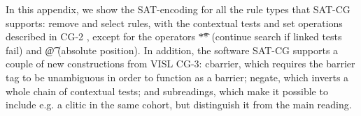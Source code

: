 \def\sobre{\text{\em sobre}}
\def\una{\text{\em una}}
\def\aproximacion{\text{ \em aproximaci\'{o}n}}
\def\mas{\text{\em m\'{a}s}}
\def\cientifica{\text{\em cient\'{\i}fica}}


\def\vPrsPThree{\text{\sc PrsP3}}
\def\vPrsPOne{\text{\sc PrsP1}}
\def\vImpPThree{\text{\sc ImpP3}}
\def\adj{{\text{\sc Adj}}}
\def\adv{{\text{\sc Adv}}}
\def\n{\text{\sc N}}
\def\pr{{\text{\sc Pr}}}
\def\prn{{\text{\sc Prn}}}
\def\det{{\text{\sc Det}}}
\def\notDet{{\neg \text{\sc Det}}}
\def\any{{\text{Any}}}


\def\sobrePr{\sobre_\pr}
\def\sobreN{\sobre_\n}

\def\unaNotDet{\una_\notDet}
\def\unaAny{\una_\any}
\def\unaPrn{\una_\prn}
\def\unaDet{\una_\det}
\def\unaPrsPThree{\una_\vPrsPThree}
\def\unaPrsPOne{\una_\vPrsPOne}
\def\unaImp{\una_\vImpPThree}
\def\aproximacionN{\aproximacion_\n}
\def\masAdv{\mas_\adv}
\def\masAdj{\mas_\adj}
\def\cientificaAdj{\cientifica_\adj}
\def\cientificaN{\cientifica_\n}


\def\newVar{\text{}} %

\def\cgrule#1{\noindent {\bf  #1 }}
\def\eqdef{\Coloneqq}
\def\impl{\quad\Longrightarrow\quad}

\def\ob#1{\overbrace{ #1 \rule{0pt}{2ex}}}






\label{appendix1}

\noindent In this appendix, we show the SAT-encoding for all the rule types that 
SAT-CG supports: 
{\sc remove} and {\sc select} rules, with the contextual tests and set operations described in CG-2 \cite{tapanainen1996}, except for the operators \t{**} (continue search if linked tests fail) and \t{@} (absolute position). In addition, the software SAT-CG supports a couple of new constructions from VISL CG-3: {\sc cbarrier}, which requires the barrier tag to be unambiguous in order to function as a barrier;
{\sc negate}, which inverts a whole chain of contextual tests; and subreadings, which make it possible to include e.g. a clitic in the same cohort, but distinguish it from the main reading.

